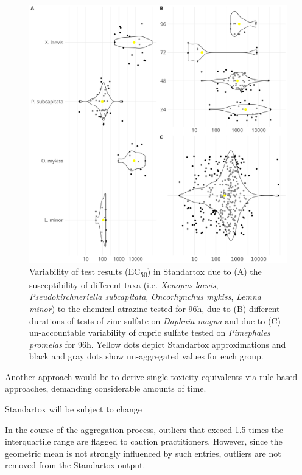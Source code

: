 \begin{figure}
    \includegraphics[width=1.0\textwidth]{article/figures/results_variability.png}
    \caption{Variability of test results (EC\textsubscript{50}) in Standartox due to (A) the susceptibility of different taxa (i.e. \textit{Xenopus laevis}, \textit{Pseudokirchneriella subcapitata}, \textit{Oncorhynchus mykiss}, \textit{Lemna minor}) to the chemical atrazine tested for 96h, due to (B) different durations of tests of zinc sulfate on \textit{Daphnia magna} and due to (C) un-accountable variability of cupric sulfate tested on \textit{Pimephales promelas} for 96h. Yellow dots depict Standartox approximations and black and gray dots show un-aggregated values for each group.}
    \label{fig:stx-variability}
\end{figure}


Another approach would be to derive single toxicity equivalents via rule-based approaches, demanding considerable amounts of time. 

Standartox will be subject to change

In the course of the aggregation process, outliers that exceed 1.5 times the interquartile range are flagged to caution practitioners. However, since the geometric mean is not strongly influenced by such entries, outliers are not removed from the Standartox output.

